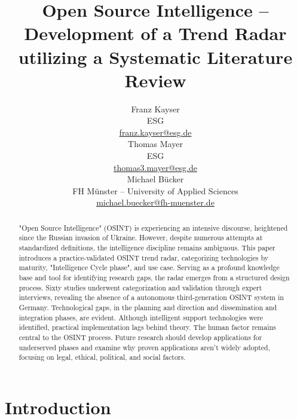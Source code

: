 \documentclass[10pt]{article}
\title{Open Source Intelligence -- Development of a Trend Radar utilizing a Systematic Literature Review}
\author{Franz Kayser \\
  ESG \\
  {\underline{ franz.kayser@esg.de}} \\\And
  Thomas Mayer \\
  ESG  \\
  {\underline{ thomas3.mayer@esg.de} }\\\And 
  Michael Bücker \\
  FH Münster -- University of Applied Sciences\\
  {\underline{michael.buecker@fh-muenster.de}} \\}
\date{}
\begin{document}
\maketitle
\begin{abstract}
    "Open Source Intelligence" (OSINT) is experiencing an intensive discourse,
    heightened since the Russian invasion of Ukraine. However, despite numerous attempts
    at standardized definitions, the intelligence discipline remains ambiguous. This paper
    introduces a practice-validated OSINT trend radar, categorizing technologies by maturity,
    "Intelligence Cycle phase", and use case. Serving as a profound knowledge base and tool for
    identifying research gaps, the radar emerges from a structured design process. Sixty
    studies underwent categorization and validation through expert interviews,
    revealing the absence of a autonomous third-generation OSINT
    system in Germany. Technological gaps, in the planning and direction and
    dissemination and integration phases, are evident. Although intelligent support
    technologies were identified, practical implementation lags behind theory. The human
    factor remains central to the OSINT process. Future research should develop
    applications for underserved phases and examine why proven applications aren't widely
    adopted, focusing on legal, ethical, political, and social factors.
\end{abstract}

\section{Introduction} \label{sec:introduction}
\end{document}
